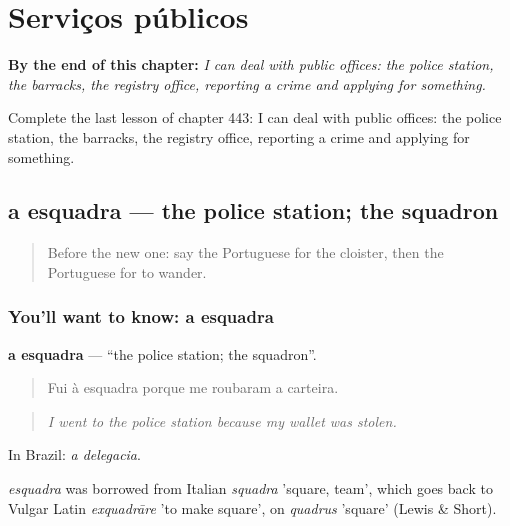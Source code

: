 
\chapter{Serviços públicos}
\label{ch:pt-servicos-publicos}

\begin{chapteropening}
\textbf{By the end of this chapter:} \emph{I can deal with public offices: the police station, the barracks, the registry office, reporting a crime and applying for something.}

Complete the last lesson of chapter 443: I can deal with public offices: the police station, the barracks, the registry office, reporting a crime and applying for something.
\end{chapteropening}

\section[a esquadra]{a esquadra — the police station; the squadron}

\label{lesson:PT-C443-esquadra}



\begin{quote}
Before the new one: say the Portuguese for the cloister, then the Portuguese for to wander.
\end{quote}

\subsection*{You'll want to know: a esquadra}
\textbf{a esquadra} — \textquotedblleft{}the police station; the squadron\textquotedblright{}.

\begin{quote}
Fui à esquadra porque me roubaram a carteira.
\end{quote}

\begin{quote}
\emph{I went to the police station because my wallet was stolen.}
\end{quote}

In Brazil: \emph{a delegacia}.

\begin{cousinweb}
\emph{esquadra} was borrowed from Italian \emph{squadra} 'square, team', which goes back to Vulgar Latin \emph{exquadrāre} 'to make square', on \emph{quadrus} 'square' (Lewis \& Short).
\end{cousinweb}

